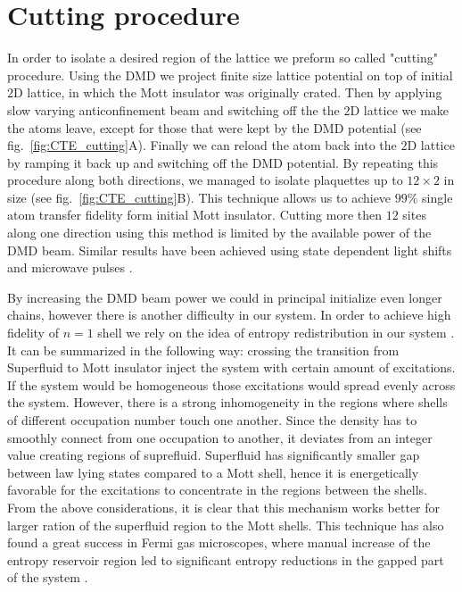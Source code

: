 \section{Cutting procedure}

In order to isolate a desired region of the lattice we preform so called "cutting" procedure. Using the DMD we project finite size lattice potential on top of initial $2\mathrm{D}$ lattice, in which the Mott insulator was originally crated. Then by applying slow varying anticonfinement beam and switching off the the $2\mathrm{D}$ lattice we make the atoms leave, except for those that were kept by the DMD potential (see fig.~\ref{fig:CTE_cutting}A). Finally we can reload the atom back into the $2\mathrm{D}$ lattice by ramping it back up and switching off the DMD potential. By repeating this procedure along both directions, we managed to isolate plaquettes up to $12\times2$ in size (see fig.~\ref{fig:CTE_cutting}B). This technique allows us to achieve $99\%$ single atom transfer fidelity form initial Mott insulator. Cutting more then $12$ sites along one direction using this method is limited by the available power of the DMD beam. Similar results have been achieved using state dependent light shifts and microwave pulses \cite{Bloch single site addresing}.

By increasing the DMD beam power we could in principal initialize even longer chains, however there is another difficulty in our system. In order to achieve high fidelity of $n=1$ shell we rely on the idea of entropy redistribution in our system \cite{some entropy redistribution}. It can be summarized in the following way: crossing the transition from Superfluid to Mott insulator inject the system with certain amount of excitations. If the system would be homogeneous those excitations would spread evenly across the system. However, there is a strong inhomogeneity in the regions where shells of different occupation number touch one another. Since the density has to smoothly connect from one occupation to another, it deviates from an integer value creating regions of suprefluid. Superfluid has significantly smaller gap between law lying states compared to a Mott shell, hence it is energetically favorable for the excitations to concentrate in the regions between the shells. From the above considerations, it is clear that this mechanism works better for larger ration of the superfluid region to the Mott shells. This technique has also found a great success in Fermi gas microscopes, where manual increase of the entropy reservoir region led to significant entropy reductions in the gapped part of the system \cite{Mazurenko2017, Chiu2018}.

